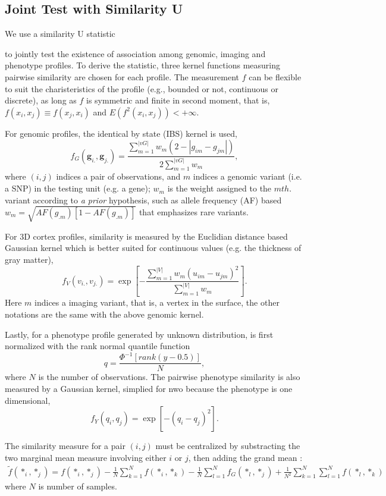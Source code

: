 \subsection{Joint Test with Similarity U}
We use a similarity U statistic {\cite{UST1, UST2} to jointly test the existence of association among genomic, imaging and phenotype profiles. To derive the statistic, three kernel functions measuring pairwise similarity are chosen for each profile. The measurement $f$ can be flexible to suit the charisteristics of the profile (e.g., bounded or not, continuous or discrete), as long as $f$ is symmetric and finite in second moment, that is, $f(x_i,x_j) \equiv f(x_j,x_i)$ and $E(f^2(x_i, x_j))<+\infty$.
\newcommand{\vg}{\boldsymbol{g}}
\newcommand{\vv}{\boldsymbol{v}}
\newcommand{\vy}{\boldsymbol{y}}
\newcommand{\vG}{\boldsymbol{G}}
\newcommand{\vV}{\boldsymbol{V}}
\newcommand{\vY}{\boldsymbol{Y}}
\newcommand{\vq}{\boldsymbol{q}}

For genomic profiles, the identical by state (IBS) kernel is used,
\label{eq:wSG}
\[ f_G(\vg_{i.}, \vg_{j.}) = \frac{\sum_{m=1}^{|vG|}{w_m(2 - |g_{im} - g_{jm}|)}} {2\sum_{m=1}^{|vG|}{w_m}}, \]
where $(i,j)$ indices a pair of observations, and $m$ indices a genomic variant (i.e. a SNP) in the testing unit (e.g. a gene); $w_m$ is the weight assigned to the $m th.$ variant according to \textit{a prior} hypothesis, such as allele frequency (AF) based $w_m=\sqrt{AF(g_{.m})[1-AF(g_{.m})]}$ that emphasizes rare variants.

For 3D cortex profiles, similarity is measured by the Euclidian distance based Gaussian kernel which is better suited for continuous values (e.g. the thickness of gray matter),
\label{eq:wSV}
\[ f_V(v_{i.},v_{j.}) = \exp{ [-\frac{\sum_{m=1}^{|V|}{w_m(u_{im}-u_{jm})^2}} {\sum_{m=1}^{|V|}{w_m}}] }. \]
Here $m$ indices a imaging variant, that is, a vertex in the surface, the other notations are the same with the above genomic kernel.

Lastly, for a phenotype profile generated by unknown distribution, is first normalized with the rank normal quantile function
\[ q = \frac{\Phi^{-1}[rank(y - 0.5)]}{N}, \]
where $N$ is the number of observations. The pairwise phenotype similarity is also measured by a Gaussian kernel, simplied for nwo because the phenotype is one dimensional,
\[ f_Y(q_i, q_j) = \exp{[-(q_i - q_j)^2]}. \]

The similarity measure for a pair $(i, j)$ must be centralized by substracting the two marginal mean measure involving either $i$ or $j$, then adding the grand mean \cite{UST1}:
\begin{align*}
  \tilde{f}(*_i, *_j) = f(*_i, *_j)-\frac{1}{N} \sum_{k=1}^N{f(*_i, *_k)}-\frac{1}{N}\sum_{l=1}^N{f_G(*_l, *_j)} + \frac{1}{N^2} \sum_{k=1}^{N} \sum_{l=1}^{N} {f(*_l, *_k)}
\end{align*}
where $N$ is number of samples. 

}
